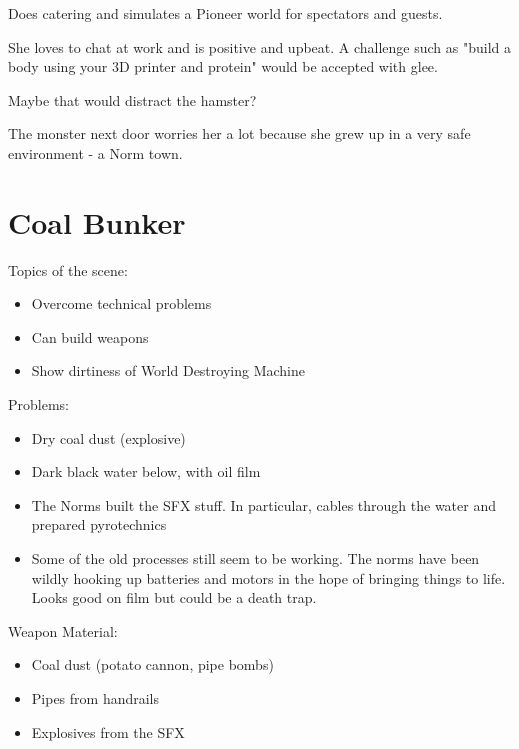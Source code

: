 \begin{npcBox}[title=Cherie]
    \begin{npcDescription}
    Does catering and simulates a Pioneer world for spectators and guests.

    She loves to chat at work and is positive and upbeat. A challenge such as "build a body using your 3D printer and protein" would be accepted with glee.

    Maybe that would distract the hamster?

    The monster next door worries her a lot because she grew up in a very safe environment - a Norm town.

    \end{npcDescription}

\end{npcBox}



\section{Coal Bunker}

Topics of the scene:
\begin{itemize}
\item Overcome technical problems
\item Can build weapons
\item Show dirtiness of World Destroying Machine
\end{itemize}

Problems:

\begin{itemize}
\item Dry coal dust (explosive)
\item Dark black water below, with oil film
\item The Norms built the SFX stuff. In particular, cables through the water and prepared pyrotechnics
\item Some of the old processes still seem to be working. The norms have been wildly hooking up batteries and motors in the hope of bringing things to life. Looks good on film but could be a death trap.
\end{itemize}

Weapon Material:

\begin{itemize}
\item Coal dust (potato cannon, pipe bombs)
\item Pipes from handrails
\item Explosives from the SFX
\end{itemize}

